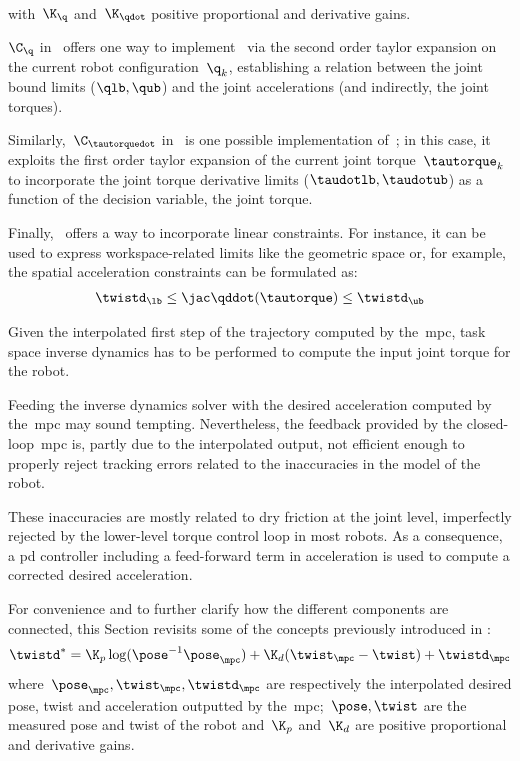 {\begin{gather}
  \end{gather}
  with~$\K_{\q}$ and~$ \K_{\qdot}$ positive proportional and derivative gains.
\item ${\C_{\q}}$ in~ offers one way to
  implement~ via the second order taylor
  expansion on the current robot configuration~${\q_k}$,
  establishing a relation between the joint bound limits (${\qlb, \qub}$) and
  the joint accelerations (and indirectly, the joint torques).
\item Similarly,~${\C_{\tautorquedot}}$ in~ is one
  possible implementation of~; in this case, it
  exploits the first order taylor expansion of the current joint
  torque~${\tautorque_k}$ to incorporate the joint torque derivative limits
  (${\taudotlb, \taudotub}$) as a function of the decision variable, the joint
  torque.
\item Finally,~ offers a way to incorporate
  linear constraints. For instance, it can be used to express workspace-related
  limits like the geometric space or, for example, the spatial acceleration
  constraints can be formulated as:
  \begin{gather}
    \twistd_{\lb} \leq \jac\qddot(\tautorque) \leq \twistd_{\ub}
  \end{gather}
}


Given the interpolated first step of the trajectory computed by the~\gls{mpc},
task space inverse dynamics has to be performed to compute the input joint
torque for the robot.

Feeding the inverse dynamics solver with the desired
acceleration computed by the~\gls{mpc} may sound tempting. Nevertheless, the
feedback provided by the closed-loop~\gls{mpc} is, partly due to the
interpolated output, not efficient enough to properly reject tracking errors
related to the inaccuracies in the model of the robot.

These inaccuracies are
mostly related to dry friction at the joint level, imperfectly rejected by the
lower-level torque control loop in most robots. As a consequence, a \gls{pd}
controller including a feed-forward term in acceleration is used to compute a
corrected desired acceleration.

For convenience and to further clarify how the different components are
connected, this Section revisits some of the concepts previously introduced in
:
\begin{gather}
\label{eqn:pd}
\twistd^* = \K_p \log(\pose^{-1}\pose_{\mpc})
  + \K_d (\twist_{\mpc}-\twist) + \twistd_{\mpc}
\end{gather}
where~${\pose_{\mpc}, \twist_{\mpc},\twistd_{\mpc}}$ are respectively the
interpolated desired pose, twist and acceleration outputted by
the~\gls{mpc};~${\pose, \twist}$ are the measured pose and twist of the robot
and~$\K_p$ and~$\K_d$ are positive proportional and derivative gains.

